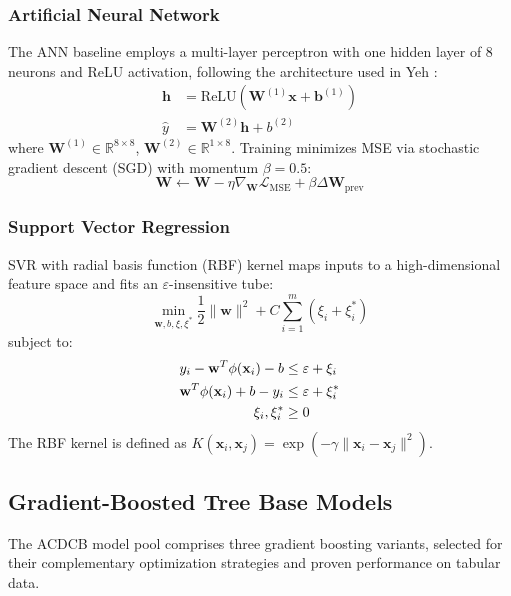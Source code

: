 \documentclass[journal]{IEEEtran}
\begin{document}
\subsubsection{Artificial Neural Network}

The ANN baseline employs a multi-layer perceptron with one hidden layer of 8 neurons and ReLU activation, following the architecture used in Yeh \cite{yeh1998concrete}:
\begin{align}
\mathbf{h} &= \text{ReLU}(\mathbf{W}^{(1)}\mathbf{x} + \mathbf{b}^{(1)}) \\
\hat{y} &= \mathbf{W}^{(2)}\mathbf{h} + b^{(2)}
\end{align}
where $\mathbf{W}^{(1)} \in \mathbb{R}^{8 \times 8}$, $\mathbf{W}^{(2)} \in \mathbb{R}^{1 \times 8}$. Training minimizes MSE via stochastic gradient descent (SGD) with momentum $\beta = 0.5$:
\begin{equation}
\mathbf{W} \leftarrow \mathbf{W} - \eta \nabla_{\mathbf{W}} \mathcal{L}_{\text{MSE}} + \beta \Delta\mathbf{W}_{\text{prev}}
\end{equation}

\subsubsection{Support Vector Regression}

SVR with radial basis function (RBF) kernel maps inputs to a high-dimensional feature space and fits an $\varepsilon$-insensitive tube:
\begin{equation}
\min_{\mathbf{w}, b, \xi, \xi^*} \frac{1}{2}\|\mathbf{w}\|^2 + C\sum_{i=1}^{m}(\xi_i + \xi_i^*)
\end{equation}
subject to:
\begin{align}
y_i - \mathbf{w}^T\phi(\mathbf{x}_i) - b &\leq \varepsilon + \xi_i \notag\\
\mathbf{w}^T\phi(\mathbf{x}_i) + b - y_i &\leq \varepsilon + \xi_i^* \notag\\
\xi_i, \xi_i^* &\geq 0 \notag
\end{align}
The RBF kernel is defined as $K(\mathbf{x}_i, \mathbf{x}_j) = \exp(-\gamma\|\mathbf{x}_i - \mathbf{x}_j\|^2)$.

\subsection{Gradient-Boosted Tree Base Models}

The ACDCB model pool comprises three gradient boosting variants, selected for their complementary optimization strategies and proven performance on tabular data.
\end{document}
